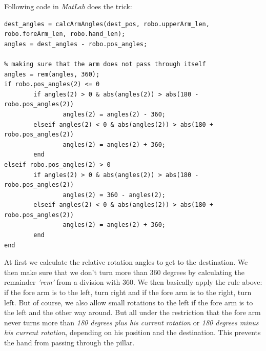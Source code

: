 Following code in {\em MatLab} does the trick:

\begin{framed}\begin{verbatim}
dest_angles = calcArmAngles(dest_pos, robo.upperArm_len, robo.foreArm_len, robo.hand_len);
angles = dest_angles - robo.pos_angles;
    
% making sure that the arm does not pass through itself
angles = rem(angles, 360);
if robo.pos_angles(2) <= 0
        if angles(2) > 0 & abs(angles(2)) > abs(180 - robo.pos_angles(2))
                angles(2) = angles(2) - 360;
        elseif angles(2) < 0 & abs(angles(2)) > abs(180 + robo.pos_angles(2))
                angles(2) = angles(2) + 360;
        end
elseif robo.pos_angles(2) > 0
        if angles(2) > 0 & abs(angles(2)) > abs(180 - robo.pos_angles(2))
                angles(2) = 360 - angles(2);
        elseif angles(2) < 0 & abs(angles(2)) > abs(180 + robo.pos_angles(2))
                angles(2) = angles(2) + 360;
        end
end
\end{verbatim}\end{framed}

At first we calculate the relative rotation angles to get to the destination. We then make sure that we don't turn more than 360 degrees by calculating the remainder {\em 'rem'} from a division with 360. We then basically apply the rule above: if the fore arm is to the left, turn right and if the fore arm is to the right, turn left. But of course, we also allow small rotations to the left if the fore arm is to the left and the other way around. But all under the restriction that the fore arm never turns more than {\em 180 degrees plus his current rotation} or {\em 180 degrees minus his current rotation}, depending on his position and the destination. This prevents the hand from passing through the pillar.

